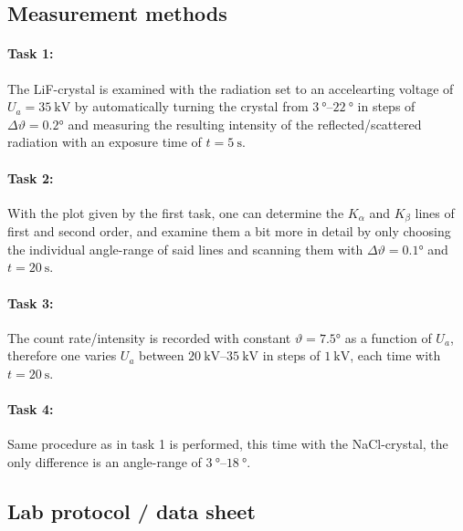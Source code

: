 \subsection{Measurement methods}
\paragraph{Task 1:} The LiF-crystal is examined with the radiation set to an accelearting voltage of \(U_a=\qty{35}{\kilo\V}\) by automatically turning the crystal from \(\qtyrange{3}{22}{\degree}\) in steps of \(\Delta \vartheta=\ang{0.2}\) and measuring the resulting intensity of the reflected/scattered radiation with an exposure time of \(t=\qty{5}{\s}\). 

\paragraph{Task 2:} 
With the plot given by the first task, one can determine the \(K_\alpha\) and \(K_\beta\) lines of first and second order, and examine them a bit more in detail by only choosing the individual angle-range of said lines and scanning them with \(\Delta \vartheta=\ang{0.1}\) and \(t=\qty{20}{\s}\).

\paragraph{Task 3:} The count rate/intensity is recorded with constant \(\vartheta=\ang{7.5}\) as a function of \(U_a\), therefore one varies \(U_a\) between \(\qtyrange{20}{35}{\kilo\volt}\) in steps of \(\qty{1}{\kilo\volt}\), each time with \(t=\qty{20}{\s}\).

\paragraph{Task 4:} Same procedure as in task 1 is performed, this time with the NaCl-crystal, the only difference is an angle-range of \(\qtyrange{3}{18}{\degree}\).
\vfill
\subsection{Lab protocol / data sheet}

